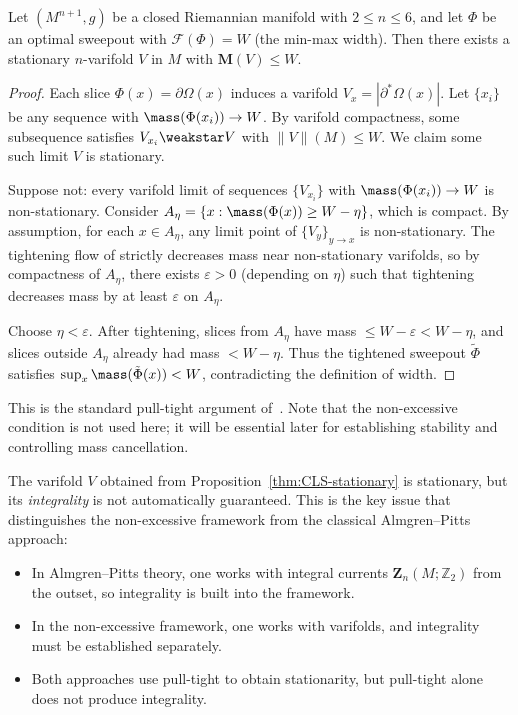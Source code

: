 \begin{proposition}\label{thm:CLS-stationary}
Let $(M^{n+1},g)$ be a closed Riemannian manifold with $2\leq n\leq 6$, and let $\Phi$ be an optimal sweepout with $\mathcal{F}(\Phi) = W$ (the min-max width). Then there exists a stationary $n$-varifold $V$ in $M$ with $\mathbf{M}(V) \leq W$.
\end{proposition}

\begin{proof}
Each slice $\Phi(x) = \partial\Omega(x)$ induces a varifold $V_x = |\partial^*\Omega(x)|$. Let $\{x_i\}$ be any sequence with $\mass(\Phi(x_i)) \to W$. By varifold compactness, some subsequence satisfies $V_{x_i} \weakstar V$ with $\|V\|(M) \leq W$. We claim some such limit $V$ is stationary.

Suppose not: every varifold limit of sequences $\{V_{x_i}\}$ with $\mass(\Phi(x_i)) \to W$ is non-stationary. Consider $A_\eta = \{x : \mass(\Phi(x)) \geq W - \eta\}$, which is compact. By assumption, for each $x \in A_\eta$, any limit point of $\{V_y\}_{y \to x}$ is non-stationary. The tightening flow of \cite{CL03} strictly decreases mass near non-stationary varifolds, so by compactness of $A_\eta$, there exists $\varepsilon > 0$ (depending on $\eta$) such that tightening decreases mass by at least $\varepsilon$ on $A_\eta$.

Choose $\eta < \varepsilon$. After tightening, slices from $A_\eta$ have mass $\leq W - \varepsilon < W - \eta$, and slices outside $A_\eta$ already had mass $< W - \eta$. Thus the tightened sweepout $\tilde{\Phi}$ satisfies $\sup_x \mass(\tilde{\Phi}(x)) < W$, contradicting the definition of width.
\end{proof}

This is the standard pull-tight argument of~\cite{CL03}. Note that the non-excessive condition is not used here; it will be essential later for establishing stability and controlling mass cancellation.

\begin{remark}
The varifold $V$ obtained from Proposition~\ref{thm:CLS-stationary} is stationary, but its \emph{integrality} is not automatically guaranteed. This is the key issue that distinguishes the non-excessive framework from the classical Almgren--Pitts approach:
\begin{itemize}
    \item In Almgren--Pitts theory, one works with integral currents $\mathbf{Z}_n(M;\mathbb{Z}_2)$ from the outset, so integrality is built into the framework.
    \item In the non-excessive framework, one works with varifolds, and integrality must be established separately.
    \item Both approaches use pull-tight to obtain stationarity, but pull-tight alone does not produce integrality.
\end{itemize}
\end{remark}

